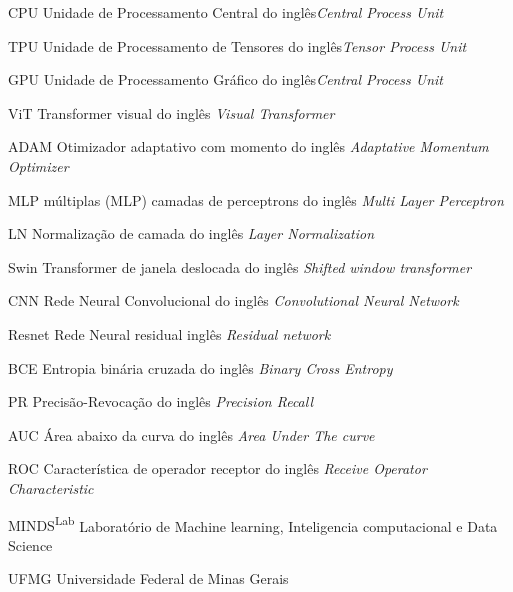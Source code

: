 \begin{siglas}
\item[CPU] Unidade de Processamento Central do inglês\textit{Central Process Unit}
\item[TPU] Unidade de Processamento de Tensores do inglês\textit{Tensor Process Unit}
\item[GPU] Unidade de Processamento Gráfico do inglês\textit{Central Process Unit}

\item[ViT] Transformer visual do inglês \textit{Visual Transformer}
\item[ADAM] Otimizador adaptativo com momento do inglês \textit{Adaptative Momentum Optimizer}
\item[MLP]  múltiplas (MLP) camadas de perceptrons do inglês \textit{Multi Layer Perceptron}
\item[LN] Normalização de camada do inglês \textit{Layer Normalization}
\item[Swin] Transformer de janela deslocada do inglês \textit{Shifted window transformer}
\item[CNN] Rede Neural Convolucional do inglês \textit{Convolutional Neural Network}
\item[Resnet] Rede Neural residual inglês \textit{Residual network}
\item[BCE] Entropia binária cruzada do inglês \textit{Binary Cross Entropy}
\item[PR] Precisão-Revocação do inglês \textit{Precision Recall}  
\item[AUC] Área abaixo da curva do inglês \textit{Area Under The curve}
\item[ROC] Característica de operador receptor do inglês \textit{Receive Operator Characteristic}  
\item[MINDS\textsuperscript{Lab}] Laboratório de Machine learning, Inteligencia computacional e Data Science
\item[UFMG] Universidade Federal de Minas Gerais

\end{siglas}
